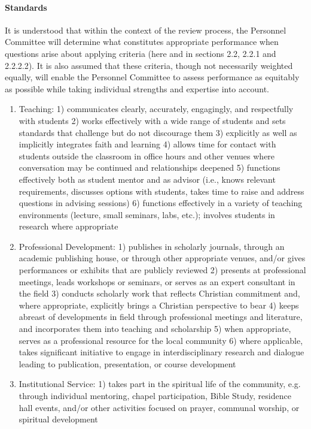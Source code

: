 \documentclass[letterpaper, 11pt]{article}
\begin{document}
			\paragraph{Standards}
				It is understood that within the context of the review process, the Personnel Committee will determine what constitutes appropriate performance when questions arise about applying criteria (here and in sections 2.2, 2.2.1 and 2.2.2.2).  It is also assumed that these criteria, though not necessarily weighted equally, will enable the Personnel Committee to assess performance as equitably as possible while taking individual strengths and expertise into account.
				\begin{enumerate}[label=\alph*)]
					\item{Teaching:}
					1) communicates clearly, accurately, engagingly, and respectfully with students
					2) works effectively with a wide range of students and sets standards that challenge but do not discourage them
					3) explicitly as well as implicitly integrates faith and learning
					4) allows time for contact with students outside the classroom in office hours and other venues where conversation may be continued and relationships deepened
					5) functions effectively both as student mentor and as advisor (i.e., knows relevant requirements, discusses options with students, takes time to raise and address questions in advising sessions)
					6) functions effectively in a variety of teaching environments (lecture, small seminars, labs, etc.); involves students in research where appropriate
					\item{Professional Development:}
					1) publishes in scholarly journals, through an academic publishing house, or through other appropriate venues, and/or gives performances or exhibits that are publicly reviewed
					2) presents at professional meetings, leads workshops or seminars, or serves as an expert consultant in the field
					3) conducts scholarly work that reflects Christian commitment and, where appropriate, explicitly brings a Christian perspective to bear
					4) keeps abreast of developments in field through professional meetings and literature, and incorporates them into teaching and scholarship
					5) when appropriate, serves as a professional resource for the local community
					6) where applicable, takes significant initiative to engage in interdisciplinary research and dialogue leading to publication, presentation, or course development
					\item{Institutional Service:}
					1) takes part in the spiritual life of the community, e.g. through individual mentoring, chapel participation, Bible Study, residence hall events, and/or other activities focused on prayer, communal worship, or spiritual development

\end{enumerate}
\end{document}
